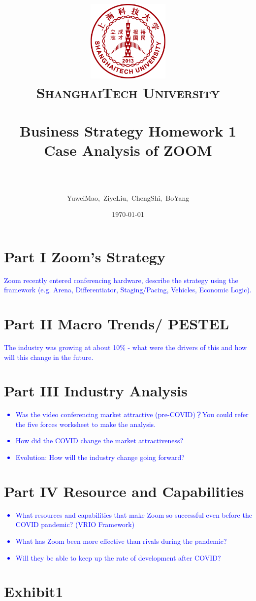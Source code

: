 \documentclass[english]{article}
\title{
\begin{center}
\includegraphics[width=0.3\textwidth]{pics/x1.eps}\\[1cm] 
    \normalfont \normalsize
    \textsc{ShanghaiTech University} \\ [25pt]
    \horrule{1pt} \\[0.4cm] %
    \huge Business Strategy Homework 1\\ %
    \huge Case Analysis of \textbf{ZOOM}\\
    \horrule{1pt} \\[0.5cm] %
\end{center}}
\author{YuweiMao,\ ZiyeLiu,\ ChengShi,\ BoYang}
\date{ \today}
\begin{document}
\maketitle
\pagebreak
\section{Part I \quad Zoom’s Strategy}
\textcolor{blue}{Zoom recently entered conferencing hardware, describe the strategy using the framework (e.g. Arena, Differentiator, Staging/Pacing, Vehicles, Economic Logic).}

\section{Part II \quad Macro Trends/ PESTEL}
\textcolor{blue}{The industry was growing at about 10\% - what were the drivers of this and how will this change in the future.}

\section{Part III \quad Industry Analysis }
\textcolor{blue}{
\begin{itemize}
    \item Was the video conferencing market attractive (pre-COVID)？You could refer the five forces worksheet to make the analysis.
    \item How did the COVID change the market attractiveness?
    \item Evolution: How will the industry change going forward?
\end{itemize}}
\section{Part IV \quad Resource and Capabilities}
\textcolor{blue}{
\begin{itemize}
    \item What resources and capabilities that make Zoom so successful even before the COVID pandemic? (VRIO Framework)
    \item What has Zoom been more effective than rivals during the pandemic?
    \item Will they be able to keep up the rate of development after COVID?
\end{itemize}}
\section{Exhibit1}
\end{document}
